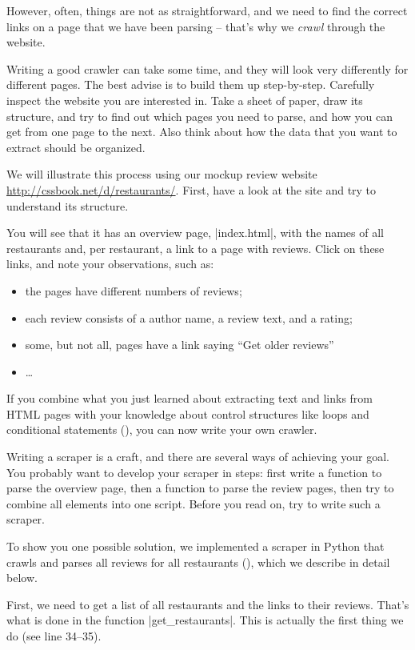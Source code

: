 However, often, things are not as straightforward, and we need to find
the correct links on a page that we have been parsing -- that's why we
\emph{crawl} through the website.

Writing a good crawler can take some time, and they will look very
differently for different pages. The best advise is to build them up
step-by-step. Carefully inspect the website you are interested in.
Take a sheet of paper, draw its structure, and try to find out which
pages you need to parse, and how you can get from one page to the next.
Also think about how the data that you want to extract should be organized.

We will illustrate this process using our mockup review website \url{http://cssbook.net/d/restaurants/}.
First, have a look at the site and try to understand its structure.

You will see that it has an overview page, |index.html|, with the
names of all restaurants and, per restaurant, a link to a page with reviews.
Click on these links, and note your observations, such as:
\begin{itemize}
\item the pages have different numbers of reviews;
\item each review consists of a author name, a review text, and a rating;
\item some, but not all, pages have a link saying ``Get older reviews''
\item \ldots
\end{itemize}

If you combine what you just learned about extracting text and links from HTML
pages with your knowledge about control structures like loops and conditional
statements (), you can now write your own crawler.

Writing a scraper is a craft, and there are several ways of achieving your goal.
You probably want to develop your scraper in steps: first write a function to
parse the overview page, then a function to parse the review pages, then try
to combine all elements into one script. Before you read on, try to write
such a scraper.

To show you one possible solution, we implemented a scraper in Python
that crawls and parses all reviews for all restaurants
(), which we describe in detail below.


First, we need to get a list of all restaurants and the links to their
reviews. That's what is done in the function |get_restaurants|. This
is actually the first thing we do (see line 34--35).

